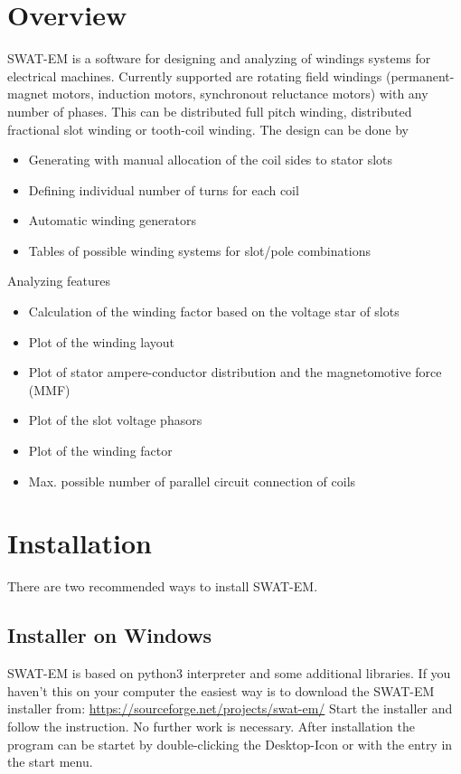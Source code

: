 \documentclass[]{scrreprt}
\begin{document}
\chapter{Overview}
SWAT-EM is a software for designing and analyzing of windings systems for electrical machines. Currently supported are rotating field windings (permanent-magnet motors, induction motors, synchronout reluctance motors) with any number of phases. This can be distributed full pitch winding, distributed fractional slot winding or tooth-coil winding. The design can be done by 
\begin{itemize}
 \item Generating with manual allocation of the coil sides to stator slots
 \item Defining individual number of turns for each coil
 \item Automatic winding generators
 \item Tables of possible winding systems for slot/pole combinations
\end{itemize}
% 
% 
% 
Analyzing features
\begin{itemize}
\item Calculation of the winding factor based on the voltage star of slots
\item Plot of the winding layout
\item Plot of stator ampere-conductor distribution and the magnetomotive force (MMF)
\item Plot of the slot voltage phasors
\item Plot of the winding factor
\item Max. possible number of parallel circuit connection of coils
\end{itemize}




\chapter{Installation}
There are two recommended ways to install SWAT-EM. 
%
\section{Installer on Windows}
SWAT-EM is based on python3 interpreter and some additional libraries. If you haven't this on your computer the easiest way is to download the SWAT-EM installer from:
\url{https://sourceforge.net/projects/swat-em/}
%
Start the installer and follow the instruction. No further work is necessary. After installation
the program can be startet by double-clicking the Desktop-Icon or with the entry in the start menu.
%
\end{document}
